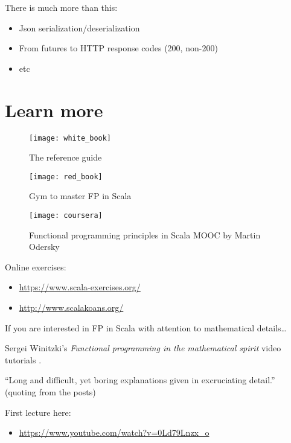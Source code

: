 \documentclass[10pt]{beamer}
\begin{document}
\begin{frame}
There is much more than this:
\begin{itemize}
\item Json serialization/deserialization 
\item From futures to HTTP response codes (200, non-200)
\item etc
\end{itemize}
\end{frame}

\section{Learn more}

\begin{frame}
\begin{figure}
\centering
\texttt{[image: white\_book]}
\caption{The reference guide}
\end{figure}
\end{frame}

\begin{frame}
\begin{figure}
\centering
\texttt{[image: red\_book]}
\caption{Gym to master FP in Scala}
\end{figure}
\end{frame}

\begin{frame}
\begin{figure}
\centering
\texttt{[image: coursera]}
\caption{Functional programming principles in Scala MOOC by Martin Odersky}
\end{figure}
\end{frame}

\begin{frame}
Online exercises:
\begin{itemize}
\item \url{https://www.scala-exercises.org/}
\item \url{http://www.scalakoans.org/}
\end{itemize}
\end{frame}

\begin{frame}[fragile]
If you are interested in FP in Scala with attention to mathematical details\ldots 


Sergei Winitzki's 
\emph{Functional programming in the mathematical spirit} video tutorials .

``Long and difficult, yet boring explanations given in excruciating detail.'' (quoting from the posts)  

First lecture here:
\begin{itemize}
\item 
\url{https://www.youtube.com/watch?v=0Ld79Lnzx_o}
\end{itemize}
\end{frame}


% 
% 
\end{document}
